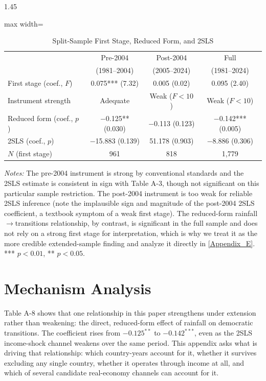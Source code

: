 \documentclass[12pt]{article}
\begin{document}
\begin{bibunit}[jpe]
\begin{spacing}{1.45}
\begin{table}[H]
\centering
\begin{adjustbox}{max width=\textwidth}
\begin{threeparttable}
\caption{Split-Sample First Stage, Reduced Form, and 2SLS}
\label{tab:D9}
\begin{tabular}{lccc}
\toprule
 & Pre-2004 & Post-2004 & Full \\
 & (1981--2004) & (2005--2024) & (1981--2024) \\
\midrule
First stage (coef., $F$)   & 0.075*** (7.32) & 0.005 (0.02) & 0.095 (2.40) \\
Instrument strength         & Adequate        & Weak ($F<10$) & Weak ($F<10$) \\
Reduced form (coef., $p$)  & $-$0.125** (0.030) & $-$0.113 (0.123) & $-$0.142*** (0.005) \\
2SLS (coef., $p$)           & $-$15.883 (0.139) & 51.178 (0.903) & $-$8.886 (0.306) \\
$N$ (first stage)           & 961             & 818          & 1{,}779 \\
\bottomrule
\end{tabular}
\begin{tablenotes}[flushleft]
\footnotesize
\item \textit{Notes:} The pre-2004 instrument is strong by conventional standards and the 2SLS estimate is consistent in sign with Table A-3, though not significant on this particular sample restriction. The post-2004 instrument is too weak for reliable 2SLS inference (note the implausible sign and magnitude of the post-2004 2SLS coefficient, a textbook symptom of a weak first stage). The reduced-form rainfall$\to$transitions relationship, by contrast, is significant in the full sample and does not rely on a strong first stage for interpretation, which is why we treat it as the more credible extended-sample finding and analyze it directly in \ref{Appendix_E}. *** $p<0.01$, ** $p<0.05$.
\end{tablenotes}
\end{threeparttable}
\end{adjustbox}
\end{table}

\section{Mechanism Analysis\label{Appendix_E}}

Table A-8 shows that one relationship in this paper strengthens under extension rather than weakening: the direct, reduced-form effect of rainfall on democratic transitions. The coefficient rises from $-0.125^{**}$ to $-0.142^{***}$, even as the 2SLS income-shock channel weakens over the same period. This appendix asks what is driving that relationship: which country-years account for it, whether it survives excluding any single country, whether it operates through income at all, and which of several candidate real-economy channels can account for it.


\end{spacing}
\end{bibunit}
\end{document}
